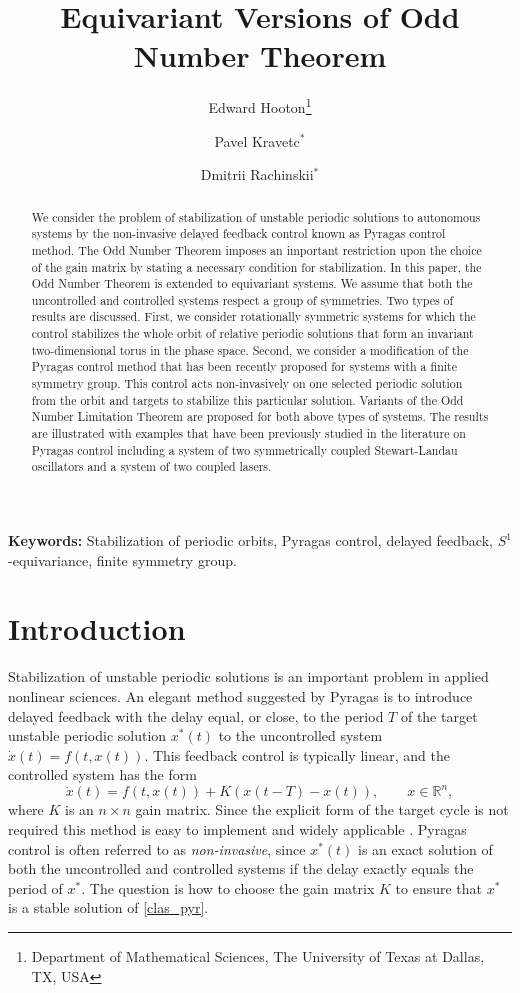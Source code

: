 \documentclass{article}
\title{Equivariant Versions of Odd Number Theorem}
\author{Edward Hooton\thanks{Department of Mathematical Sciences, The University of Texas at Dallas, TX, USA}
	\and Pavel Kravetc$^*$ \and Dmitrii Rachinskii$^*$}
\date{}
\begin{document}
\maketitle

	\begin{abstract}
		We consider the problem of stabilization of unstable periodic solutions to autonomous systems by the non-invasive delayed feedback control known as Pyragas control method.
		The Odd Number Theorem imposes an important restriction upon the choice of the gain matrix by stating a necessary condition for stabilization. 
		In this paper, the Odd Number Theorem is extended to equivariant systems.
		We assume that both the uncontrolled and controlled systems respect a group of symmetries. Two types of results are discussed.
		First, we consider rotationally symmetric systems for which the control stabilizes the whole orbit of relative periodic solutions that form an invariant two-dimensional torus in the phase space.
		Second, we consider a modification of the Pyragas control method that has been recently proposed for systems with a finite symmetry group. This control acts non-invasively on one selected periodic solution from the orbit and targets to stabilize this particular solution. Variants of the Odd Number Limitation Theorem are proposed for both above types of systems. The results are illustrated
		with examples that have been previously studied in the literature on Pyragas control including a system of two symmetrically coupled Stewart-Landau oscillators and a system of two coupled lasers.
	\end{abstract}
	
{\bf Keywords:} Stabilization of periodic orbits, Pyragas control, delayed feedback, $S^1$-equivariance, finite symmetry group.

\section{Introduction}

Stabilization of unstable periodic solutions is an important problem in applied nonlinear sciences.
An elegant method suggested by Pyragas \cite{pyragas1992continuous} is to introduce delayed feedback with the delay equal, or close, to the period
$T$ of the target unstable periodic solution $x^*(t)$ to the uncontrolled system $\dot x(t)=f(t,x(t))$.
This feedback control is typically linear, and the controlled system has the form
\begin{equation}\label{clas_pyr}
\dot x(t) = f(t,x(t))+ K(x(t-T)-x(t)), \qquad x\in \mathbb R^n,
\end{equation}
where  $K$ is an $n\times n$ gain matrix. Since the explicit form of the target cycle is not required this method is easy to implement and widely applicable \cite{app1,app2, app3}.
Pyragas control is often referred to as {\em non-invasive},
since $x^*(t)$ is an exact solution of both the uncontrolled and controlled systems
if the delay exactly equals the period of $x^*$. The question is how to choose the gain matrix $K$ to ensure that
$x^*$ is a stable solution of \eqref{clas_pyr}.
\end{document}

